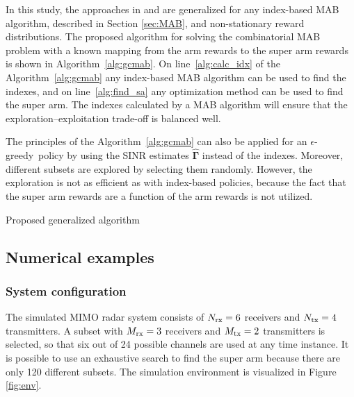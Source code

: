 \documentclass[english, 12pt, a4paper, elec, utf8, a-1b, online]{aaltothesis}
\numberwithin{equation}{section}
\newcommand{\egreedy}{$\epsilon$-greedy~}
\newcommand{\vsinrb}{\widehat{\boldsymbol{\Gamma}}}
\begin{document}
In this study, the approaches in \cite{Mukherjee2012} and \cite{Kuai2019} are generalized for any index-based MAB algorithm, described in Section \ref{sec:MAB}, and non-stationary reward distributions.
The proposed algorithm for solving the combinatorial MAB problem with a known mapping from the arm rewards to the super arm rewards is shown in Algorithm~\ref{alg:gcmab}.
On line~\ref{alg:calc_idx} of the Algorithm~\ref{alg:gcmab} any index-based MAB algorithm can be used to find the indexes, and on line~\ref{alg:find_sa} any optimization method can be used to find the super arm.
The indexes calculated by a MAB algorithm will ensure that the exploration--exploitation trade-off is balanced well.

The principles of the Algorithm~\ref{alg:gcmab} can also be applied for an \egreedy policy by using the SINR estimates $\vsinrb$ instead of the indexes.
Moreover, different subsets are explored by selecting them randomly.
However, the exploration is not as efficient as with index-based policies, because the fact that the super arm rewards are a function of the arm rewards is not utilized.

\begin{algorithm}[h]
\SetAlgoLined
{}
\caption{Proposed generalized algorithm}
\label{alg:gcmab}
\end{algorithm}

\subsection{Numerical examples}
\label{sec:sim}


\subsubsection{System configuration}
\label{sec:sys_conf}
The simulated MIMO radar system consists of ${N_{\text{rx}}}=6$ receivers and ${N_{\text{tx}}}=4$ transmitters.
A subset with ${M_{\text{rx}}}=3$ receivers and ${M_{\text{tx}}}=2$ transmitters is selected, so that six out of 24 possible channels are used at any time instance.
It is possible to use an exhaustive search to find the super arm because there are only 120 different subsets.
The simulation environment is visualized in Figure \ref{fig:env}.
\end{document}
